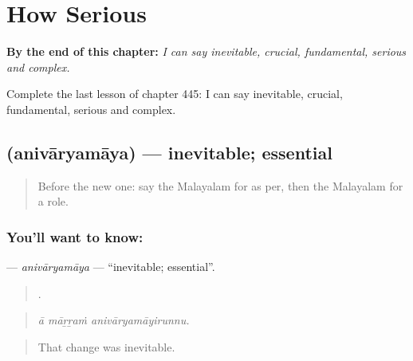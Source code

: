 
\chapter{How Serious}
\label{ch:ml-how-serious}

\begin{chapteropening}
\textbf{By the end of this chapter:} \emph{I can say inevitable, crucial, fundamental, serious and complex.}

Complete the last lesson of chapter 445: I can say inevitable, crucial, fundamental, serious and complex.
\end{chapteropening}

\section[\texorpdfstring{\ml{അനിവാര്യമായ} (anivāryamāya)}{അനിവാര്യമായ (anivāryamāya)}]{ (anivāryamāya) — inevitable; essential}

\label{lesson:ML-C445-anivaryamaya}



\begin{quote}
Before the new one: say the Malayalam for as per, then the Malayalam for a role.
\end{quote}

\subsection*{You'll want to know: }
\textbf{} — \emph{anivāryamāya} — \textquotedblleft{}inevitable; essential\textquotedblright{}.

\begin{quote}
  .
\end{quote}

\begin{quote}
\emph{ā māṟṟaṁ anivāryamāyirunnu.}
\end{quote}

\begin{quote}
That change was inevitable.
\end{quote}

